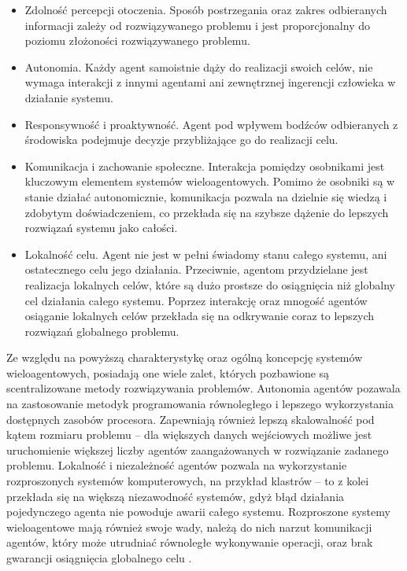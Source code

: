 {{        \begin{itemize}
            \item Zdolność percepcji otoczenia. Sposób postrzegania oraz zakres odbieranych informacji zależy od
            rozwiązywanego problemu i jest proporcjonalny do poziomu złożoności rozwiązywanego problemu.
            \item Autonomia. Każdy agent samoistnie dąży do realizacji swoich celów, nie wymaga interakcji z innymi
            agentami ani zewnętrznej ingerencji człowieka w działanie systemu.
            \item Responsywność i proaktywność. Agent pod wpływem bodźców odbieranych z środowiska podejmuje decyzje
            przybliżające go do realizacji celu.
            \item Komunikacja i zachowanie społeczne. Interakcja pomiędzy osobnikami jest kluczowym elementem systemów
            wieloagentowych. Pomimo że osobniki są w stanie działać autonomicznie, komunikacja pozwala na dzielnie się
            wiedzą i zdobytym doświadczeniem, co przekłada się na szybsze dążenie do lepszych rozwiązań systemu jako
            całości.
            \item Lokalność celu. Agent nie jest w pełni świadomy stanu całego systemu, ani ostatecznego celu jego
            działania. Przeciwnie, agentom przydzielane jest realizacja lokalnych celów, które są dużo prostsze do
            osiągnięcia niż globalny cel działania całego systemu. Poprzez interakcję oraz mnogość agentów osiąganie
            lokalnych celów przekłada się na odkrywanie coraz to lepszych rozwiązań globalnego problemu.
        \end{itemize}

        Ze względu na powyższą charakterystykę oraz ogólną koncepcję systemów wieloagentowych, posiadają one wiele
        zalet, których pozbawione są scentralizowane metody rozwiązywania problemów. Autonomia agentów pozawala na
        zastosowanie metodyk programowania równoległego i lepszego wykorzystania dostępnych zasobów procesora.
        Zapewniają również lepszą skalowalność pod kątem rozmiaru problemu -- dla większych danych wejściowych możliwe
        jest uruchomienie większej liczby agentów zaangażowanych w rozwiązanie zadanego problemu. Lokalność i
        niezależność agentów pozwala na wykorzystanie rozproszonych systemów komputerowych, na przykład klastrów -- to z
        kolei przekłada się na większą niezawodność systemów, gdyż błąd działania pojedynczego agenta nie powoduje
        awarii całego systemu. Rozproszone systemy wieloagentowe mają również swoje wady, należą do nich narzut
        komunikacji agentów, który może utrudniać równoległe wykonywanie operacji, oraz brak gwarancji osiągnięcia
        globalnego celu \cite{Dorri2018MultiAgentSA, Balaji2010AnIT}.

}}
